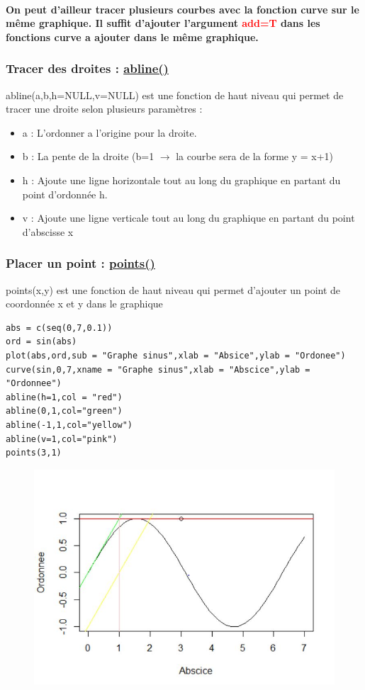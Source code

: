 \documentclass{article}
\newcommand{\argument}[1]{\textcolor{red}{#1}}
\begin{document}
\paragraph{On peut d'ailleur tracer plusieurs courbes avec la fonction curve sur le même graphique. Il suffit d'ajouter l'argument \argument{add=T} dans les fonctions curve a ajouter dans le même graphique.}

\subsubsection{Tracer des droites : \href{https://www.rdocumentation.org/packages/graphics/versions/3.6.2/topics/abline}{abline()} }
abline(a,b,h=NULL,v=NULL) est une fonction de haut niveau qui permet de tracer une droite selon plusieurs paramètres : 
\begin{itemize}
    \item a : L'ordonner a l'origine pour la droite. 
    \item b : La pente de la droite (b=1 $\rightarrow$ la courbe sera de la forme y = x+1)
    \item h : Ajoute une ligne horizontale tout au long du graphique en partant du point d’ordonnée h.
    \item v : Ajoute une ligne verticale tout au long du graphique en partant du point d’abscisse x
\end{itemize}

\subsubsection{Placer un point : \href{https://www.rdocumentation.org/packages/reddPrec/versions/0.4.0/topics/points}{points()}}
points(x,y) est une fonction de haut niveau qui permet d'ajouter un point de coordonnée x et y dans le graphique

\begin{verbatim}
abs = c(seq(0,7,0.1))
ord = sin(abs)
plot(abs,ord,sub = "Graphe sinus",xlab = "Absice",ylab = "Ordonee")
curve(sin,0,7,xname = "Graphe sinus",xlab = "Abscice",ylab = "Ordonnee")
abline(h=1,col = "red")
abline(0,1,col="green")
abline(-1,1,col="yellow")
abline(v=1,col="pink")
points(3,1)
\end{verbatim}
\newpage
\begin{figure}[!h]
    \centering
    \includegraphics[scale=0.9]{exempleR.JPG}
\end{figure}
\end{document}
